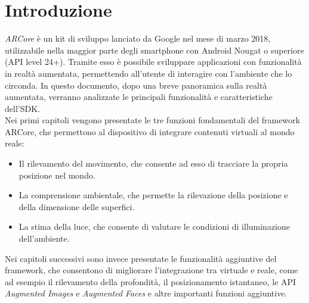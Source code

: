 \documentclass[crop=false, class=book]{standalone}
\begin{document}
	\chapter{Introduzione}
	\textit{ARCore} è un kit di sviluppo lanciato da Google nel mese di marzo 2018, utilizzabile nella maggior parte degli smartphone con Android Nougat o superiore (API level 24+). Tramite esso è possibile sviluppare applicazioni con funzionalità in realtà aumentata, permettendo all'utente di interagire con l'ambiente che lo circonda.
	In questo documento, dopo una breve panoramica sulla realtà aumentata, verranno analizzate le principali funzionalità e caratteristiche dell'SDK.
	\\
	Nei primi capitoli vengono presentate le tre funzioni fondamentali del framework ARCore, che permettono al dispositivo di integrare contenuti virtuali al mondo reale:
	\begin{itemize}
		\item Il rilevamento del movimento, che consente ad esso di tracciare la propria posizione nel mondo.
		\item La comprensione ambientale, che permette la rilevazione della posizione e della dimensione delle superfici.
		\item La stima della luce, che consente di valutare le condizioni di illuminazione dell'ambiente.
	\end{itemize}
	Nei capitoli successivi sono invece presentate le funzionalità aggiuntive del framework, che consentono di migliorare l'integrazione tra virtuale e reale, come ad esempio il rilevamento della profondità, il posizionamento istantaneo, le API \textit{Augmented Images} e \textit{Augmented Faces} e altre importanti funzioni aggiuntive.
\end{document}
